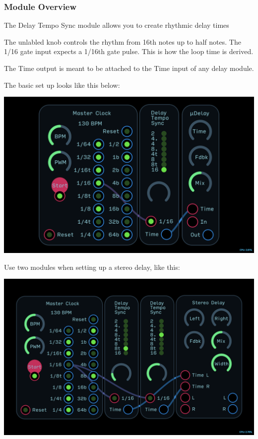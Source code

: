 \documentclass[11pt]{book}
\begin{document}
\begin{multicols*}{2}

\subsubsection*{Module Overview}

The Delay Tempo Sync module allows you to create rhythmic delay times

The unlabled knob controls the rhythm from 16th notes up to half notes. The 1/16 gate input expects a 1/16th gate pulse. This is how the loop time is derived.

The Time output is meant to be attached to the Time input of any delay module.

The basic set up looks like this below:

\begin{center}
\includegraphics[width=0.95\linewidth]{delay-tempo-sync-fig1.png}
\end{center}

Use two modules when setting up a stereo delay, like this:

\begin{center}
\includegraphics[width=0.95\linewidth]{delay-tempo-sync-fig2.png}
\end{center}


\end{multicols*}
\end{document}
